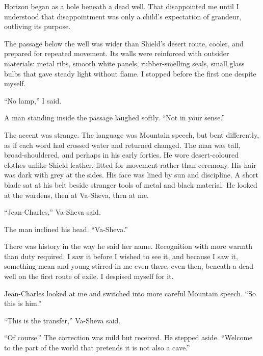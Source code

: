 Horizon began as a hole beneath a dead well. That disappointed me until I understood that disappointment was only a child's expectation of grandeur, outliving its purpose.\par

The passage below the well was wider than Shield's desert route, cooler, and prepared for repeated movement. Its walls were reinforced with outsider materials: metal ribs, smooth white panels, rubber-smelling seals, small glass bulbs that gave steady light without flame. I stopped before the first one despite myself.\par

``No lamp,'' I said.\par

A man standing inside the passage laughed softly. ``Not in your sense.''\par

The accent was strange. The language was Mountain speech, but bent differently, as if each word had crossed water and returned changed. The man was tall, broad-shouldered, and perhaps in his early forties. He wore desert-coloured clothes unlike Shield leather, fitted for movement rather than ceremony. His hair was dark with grey at the sides. His face was lined by sun and discipline. A short blade sat at his belt beside stranger tools of metal and black material. He looked at the wardens, then at Va-Sheva, then at me.\par

``Jean-Charles,'' Va-Sheva said.\par

The man inclined his head. ``Va-Sheva.''\par

There was history in the way he said her name. Recognition with more warmth than duty required. I saw it before I wished to see it, and because I saw it, something mean and young stirred in me even there, even then, beneath a dead well on the first route of exile. I despised myself for it.\par

Jean-Charles looked at me and switched into more careful Mountain speech. ``So this is him.''\par

``This is the transfer,'' Va-Sheva said.\par

``Of course.'' The correction was mild but received. He stepped aside. ``Welcome to the part of the world that pretends it is not also a cave.''\par

